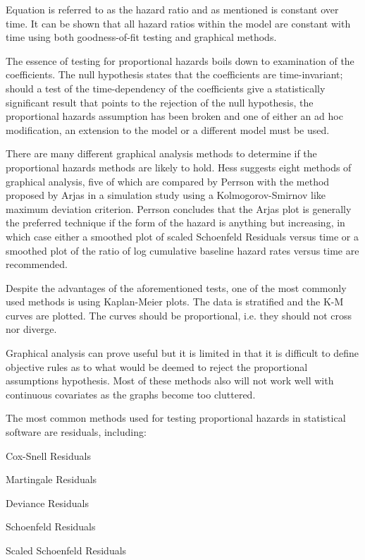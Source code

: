 Equation  is referred to as the hazard ratio and as mentioned is constant over time. It can be shown that all hazard ratios within the model are constant with time using both goodness-of-fit testing and graphical methods.

The essence of testing for proportional hazards boils down to examination of the coefficients. The null hypothesis states that the coefficients are time-invariant; should a test of the time-dependency of the coefficients give a statistically significant result that points to the rejection of the null hypothesis, the proportional hazards assumption has been broken and one of either an ad hoc modification, an extension to the model or a different model must be used.

There are many different graphical analysis methods to determine if the proportional hazards methods are likely to hold. Hess  suggests eight methods of graphical analysis, five of which are compared by Perrson  with the method proposed by Arjas  in a simulation study using a Kolmogorov-Smirnov like maximum deviation criterion. Perrson  concludes that the Arjas plot is generally the preferred technique if the form of the hazard is anything but increasing, in which case either a smoothed plot of scaled Schoenfeld Residuals versus time or a smoothed plot of the ratio of log cumulative baseline hazard rates versus time are recommended.

Despite the advantages of the aforementioned tests, one of the most commonly used methods is using Kaplan-Meier plots. The data is stratified and the K-M curves are plotted. The curves should be proportional, i.e. they should not cross nor diverge.  

Graphical analysis can prove useful but it is limited in that it is difficult to define objective rules as to what would be deemed to reject the proportional assumptions hypothesis. Most of these methods also will not work well with continuous covariates as the graphs become too cluttered.

The most common methods used for testing proportional hazards in statistical software are residuals, including:

\begin{itemize}
\begin{spacing}{0}
    \item Cox-Snell Residuals
    \item Martingale Residuals
    \item Deviance Residuals
    \item Schoenfeld Residuals
    \item Scaled Schoenfeld Residuals
\end{spacing}
\end{itemize}

